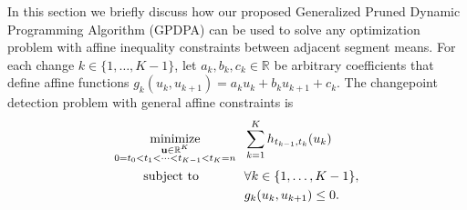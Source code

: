 \documentclass{article}
\DeclareMathOperator*{\minimize}{minimize}
\newcommand{\RR}{\mathbb R}
\begin{document}






In this section we briefly discuss how our proposed Generalized Pruned
Dynamic Programming Algorithm (GPDPA) can be used to solve any
optimization problem with affine inequality constraints
between adjacent segment means. For each change $k\in\{1,\dots,K-1\}$,
let $a_k,b_k,c_k\in\RR$ be arbitrary coefficients that define affine
functions $g_k(u_k, u_{k+1})=a_k u_k + b_k u_{k+1} + c_k$. The
changepoint detection problem with general affine constraints is
\begin{align}
  \label{eq:min_general_affine_inequality}
  \minimize_{
    \substack{
    \mathbf u\in\RR^K\\
0=t_0<t_1<\cdots<t_{K-1}<t_K=n
}
    } &\ \ 
  \sum_{k=1}^K h_{t_{k-1}, t_k}(u_k)\\
  \text{subject to \hskip 0.9cm} &\ \  \forall k\in\{1,\dots,K-1\},
  \nonumber\\
&\ \ g_k(u_k, u_{k+1})\leq 0.\nonumber                        
\nonumber
\end{align}
\end{document}
